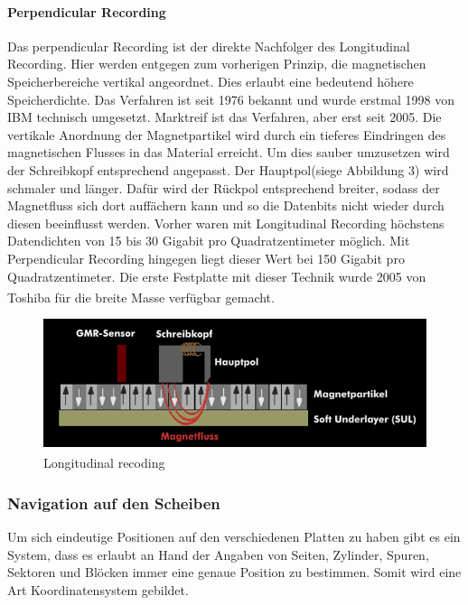\documentclass[a4paper, DIV20, 12pt, headsepline, parskip, flushleft]{scrartcl}
\begin{document}
\paragraph{Perpendicular Recording}
Das perpendicular Recording ist der direkte Nachfolger des Longitudinal Recording. Hier werden entgegen zum vorherigen Prinzip, die magnetischen Speicherbereiche vertikal angeordnet. Dies erlaubt eine bedeutend höhere Speicherdichte. Das Verfahren ist seit 1976 bekannt und wurde erstmal 1998 von IBM technisch umgesetzt. Marktreif ist das Verfahren, aber erst seit 2005. Die vertikale Anordnung der Magnetpartikel wird durch ein tieferes Eindringen des magnetischen Flusses in das Material erreicht. Um dies sauber umzusetzen wird der Schreibkopf entsprechend angepasst. Der Hauptpol(siege Abbildung 3) wird schmaler und länger. Dafür wird der Rückpol entsprechend breiter, sodass der Magnetfluss sich dort auffächern kann und so die Datenbits nicht wieder durch diesen beeinflusst werden. Vorher waren mit Longitudinal Recording höchstens Datendichten von 15 bis 30 Gigabit pro Quadratzentimeter möglich. Mit Perpendicular Recording hingegen liegt dieser Wert bei 150 Gigabit pro Quadratzentimeter. Die erste Festplatte mit dieser Technik wurde 2005 von Toshiba für die breite Masse verfügbar gemacht.  \textsuperscript{\cite{pr}\cite{pr1}}
\begin{figure}[H]
\begin{center}
\includegraphics[scale=0.5]{prinzip-des-perpendicular-recordings.png}
\end{center}
\caption{Longitudinal recoding \textsuperscript{\cite{img:pr}}}
\end{figure}
\subsubsection{Navigation auf den Scheiben}
Um sich eindeutige Positionen auf den verschiedenen Platten zu haben gibt es ein System, dass es erlaubt an Hand der Angaben von Seiten, Zylinder, Spuren, Sektoren und Blöcken immer eine genaue Position zu bestimmen. Somit wird eine Art Koordinatensystem gebildet.
\end{document}
